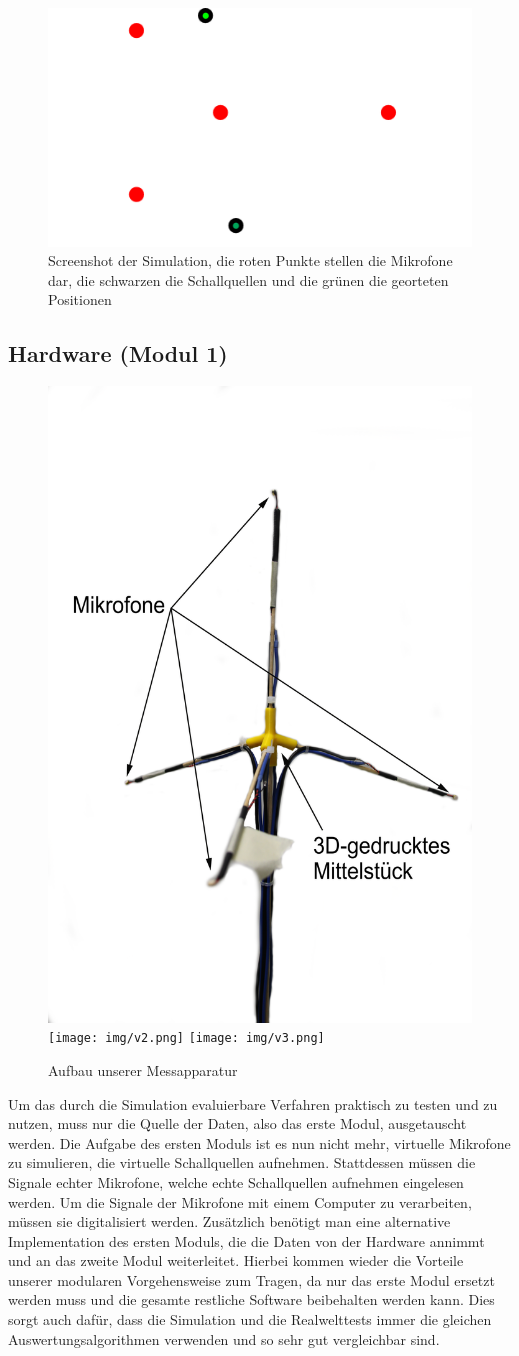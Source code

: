 \begin{figure}[H]
  \centering
  \includegraphics[width=(0.7\linewidth)]{img/bildsimulation}
  \caption{Screenshot der Simulation, die roten Punkte stellen die Mikrofone dar, die schwarzen die Schallquellen und die grünen die georteten Positionen}
\end{figure}

\subsection{Hardware (Modul 1)}
\begin{figure}[H]
	\centering
	\includegraphics[width=0.3\linewidth]{img/v1.png}
	\texttt{[image: img/v2.png]}
	\texttt{[image: img/v3.png]}
	\caption{Aufbau unserer Messapparatur}
	\label{tet}
	\vspace{-1cm}
\end{figure} 
Um das durch die Simulation evaluierbare Verfahren praktisch zu testen und zu nutzen, muss nur die Quelle der Daten, also das erste Modul, ausgetauscht werden. Die Aufgabe des ersten Moduls ist es nun nicht mehr, virtuelle Mikrofone  zu simulieren, die virtuelle Schallquellen aufnehmen. Stattdessen müssen die Signale echter Mikrofone, welche echte Schallquellen aufnehmen eingelesen werden. Um die Signale der Mikrofone mit einem Computer zu verarbeiten, müssen sie digitalisiert werden. Zusätzlich benötigt man eine alternative Implementation des ersten Moduls, die die Daten von der Hardware annimmt und an das zweite Modul weiterleitet. Hierbei kommen wieder die Vorteile unserer modularen Vorgehensweise zum Tragen, da nur das erste Modul ersetzt werden muss und die gesamte restliche Software beibehalten werden kann. Dies sorgt auch dafür, dass die Simulation und die Realwelttests immer die gleichen Auswertungsalgorithmen verwenden und so sehr gut vergleichbar sind.
